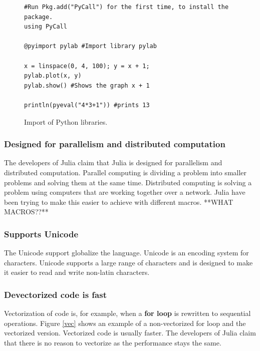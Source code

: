 \documentclass[a4paper, 11pt, titlepage]{article}
\begin{document}
\begin{figure}[H]
		\centering
		\begin{lstlisting}
#Run Pkg.add("PyCall") for the first time, to install the package.
using PyCall

@pyimport pylab #Import library pylab

x = linspace(0, 4, 100); y = x + 1;
pylab.plot(x, y)
pylab.show() #Shows the graph x + 1

println(pyeval("4*3+1")) #prints 13
		\end{lstlisting}
		\caption{Import of Python libraries.}
\end{figure}

\subsubsection{Designed for parallelism and distributed computation}
The developers of Julia claim that Julia is designed for parallelism and distributed computation. Parallel computing is dividing a problem into smaller problems and solving them at the same time. Distributed computing is solving a problem using computers that are working together over a network. Julia have been trying to make this easier to achieve with different macros.
**WHAT MACROS??**

\subsubsection{Supports Unicode}
The Unicode support globalize the language. Unicode is an encoding system for characters. Unicode supports a large range of characters and is designed to make it easier to read and write non-latin characters.

\subsubsection{Devectorized code is fast}
Vectorization of code is, for example, when a \textbf{for loop} is rewritten to sequential operations. Figure \ref{vec} shows an example of a non-vectorized for loop and the vectorized version. Vectorized code is usually faster. The developers of Julia claim that there is no reason to vectorize as the performance stays the same.
\end{document}
